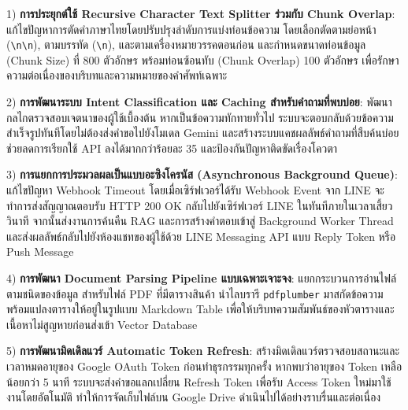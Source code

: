 \begin{mycustomitem}
\item 1) \textbf{การประยุกต์ใช้ Recursive Character Text Splitter ร่วมกับ Chunk Overlap}: แก้ไขปัญหาการตัดคำภาษาไทยโดยปรับปรุงลำดับการแบ่งท่อนข้อความ โดยเลือกตัดตามย่อหน้า (\texttt{\textbackslash n\textbackslash n}), ตามบรรทัด (\texttt{\textbackslash n}), และตามเครื่องหมายวรรคตอนก่อน และกำหนดขนาดท่อนข้อมูล (Chunk Size) ที่ 800 ตัวอักษร พร้อมท่อนซ้อนทับ (Chunk Overlap) 100 ตัวอักษร เพื่อรักษาความต่อเนื่องของบริบทและความหมายของคำศัพท์เฉพาะ
\end{mycustomitem}

\begin{mycustomitem}
\item 2) \textbf{การพัฒนาระบบ Intent Classification และ Caching สำหรับคำถามที่พบบ่อย}: พัฒนากลไกตรวจสอบเจตนาของผู้ใช้เบื้องต้น หากเป็นข้อความทักทายทั่วไป ระบบจะตอบกลับด้วยข้อความสำเร็จรูปทันทีโดยไม่ต้องส่งคำขอไปยังโมเดล Gemini และสร้างระบบแคชผลลัพธ์คำถามที่สืบค้นบ่อย ช่วยลดการเรียกใช้ API ลงได้มากกว่าร้อยละ 35 และป้องกันปัญหาติดขัดเรื่องโควตา
\end{mycustomitem}

\begin{mycustomitem}
\item 3) \textbf{การแยกการประมวลผลเป็นแบบอะซิงโครนัส (Asynchronous Background Queue)}: แก้ไขปัญหา Webhook Timeout โดยเมื่อเซิร์ฟเวอร์ได้รับ Webhook Event จาก LINE จะทำการส่งสัญญาณตอบรับ HTTP 200 OK กลับไปยังเซิร์ฟเวอร์ LINE ในทันทีภายในเวลาเสี้ยววินาที จากนั้นส่งงานการค้นคืน RAG และการสร้างคำตอบเข้าสู่ Background Worker Thread และส่งผลลัพธ์กลับไปยังห้องแชทของผู้ใช้ด้วย LINE Messaging API แบบ Reply Token หรือ Push Message
\end{mycustomitem}

\begin{mycustomitem}
\item 4) \textbf{การพัฒนา Document Parsing Pipeline แบบเฉพาะเจาะจง}: แยกกระบวนการอ่านไฟล์ตามชนิดของข้อมูล สำหรับไฟล์ PDF ที่มีตารางสินค้า นำไลบรารี \texttt{pdfplumber} มาสกัดข้อความพร้อมแปลงตารางให้อยู่ในรูปแบบ Markdown Table เพื่อให้บริบทความสัมพันธ์ของหัวตารางและเนื้อหาไม่สูญหายก่อนส่งเข้า Vector Database
\end{mycustomitem}

\begin{mycustomitem}
\item 5) \textbf{การพัฒนามิดเดิลแวร์ Automatic Token Refresh}: สร้างมิดเดิลแวร์ตรวจสอบสถานะและเวลาหมดอายุของ Google OAuth Token ก่อนทำธุรกรรมทุกครั้ง หากพบว่าอายุของ Token เหลือน้อยกว่า 5 นาที ระบบจะส่งคำขอแลกเปลี่ยน Refresh Token เพื่อรับ Access Token ใหม่มาใช้งานโดยอัตโนมัติ ทำให้การจัดเก็บไฟล์บน Google Drive ดำเนินไปได้อย่างราบรื่นและต่อเนื่อง
\end{mycustomitem}

